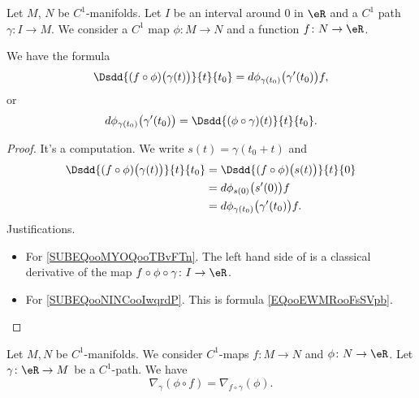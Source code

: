 \begin{proposition}      \label{PROPooALATooGgcVQV}
	Let \( M\), \( N\) be \( C^1\)-manifolds. Let \(I \) be an interval around \( 0\) in \( \eR\) and a \( C^1\) path \( \gamma\colon I\to M\). We consider a \( C^1\) map \( \phi\colon M\to N\) and a function \( f\colon N\to \eR\).

	We have the formula
	\begin{equation}        \label{EQooYHBZooUqInIC}
		\Dsdd{ (f\circ\phi)\big( \gamma(t) \big) }{t}{t_0}=d\phi_{\gamma(t_0)}\big( \gamma'(t_0) \big)f,
	\end{equation}
	or
	\begin{equation}        \label{EQooVLUIooAbGZEi}
		d\phi_{\gamma(t_0)}\big( \gamma'(t_0) \big)=\Dsdd{ (\phi\circ \gamma)(t) }{t}{t_0}.
	\end{equation}
\end{proposition}

\begin{proof}
	It's a computation. We write \( s(t)=\gamma(t_0+t)\) and
	\begin{subequations}
		\begin{align}
			\Dsdd{ (f\circ\phi)\big( \gamma(t) \big) }{t}{t_0} & =\Dsdd{ (f\circ\phi)\big( s(t) \big) }{t}{0}        \label{SUBEQooMYOQooTBvFTn} \\
			                                                   & =d\phi_{s(0)}\big( s'(0) \big)f        \label{SUBEQooNINCooIwqrdP}              \\
			                                                   & =d\phi_{\gamma(t_0)}\big( \gamma'(t_0) \big)f.
		\end{align}
	\end{subequations}
	Justifications.
	\begin{itemize}
		\item For \eqref{SUBEQooMYOQooTBvFTn}.  The left hand side of is a classical derivative of the map \( f\circ\phi\circ \gamma\colon I\to \eR\).
		\item For \eqref{SUBEQooNINCooIwqrdP}.  This is formula \eqref{EQooEWMRooFsSVpb}.
	\end{itemize}
\end{proof}

\begin{lemma}        \label{LEMooBOZBooNJMccB}
	Let \( M,N\) be \( C^1\)-manifolds. We consider \( C^1\)-maps \( f\colon M\to N\) and \( \phi\colon N\to \eR\). Let \( \gamma\colon \eR\to M\) be a \( C^1\)-path. We have
	\begin{equation}
		\nabla_{\gamma}(\phi\circ f)=\nabla_{f\circ \gamma}(\phi).
	\end{equation}
\end{lemma}

